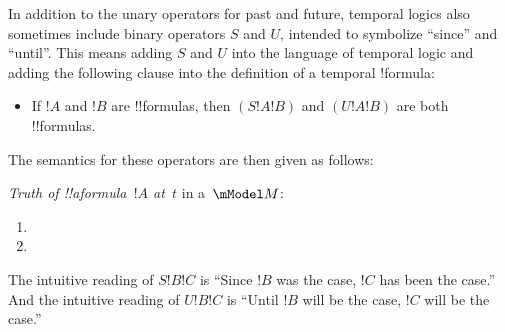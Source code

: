 \documentclass[../../../include/open-logic-section]{subfiles}
\begin{document}


In addition to the unary operators for past and future, temporal logics also sometimes
include binary operators $S$ and $U$, intended to symbolize ``since'' and ``until''. This means
adding $S$ and $U$ into the language of temporal logic and adding the following clause
into the definition of a temporal !{formula}:

\begin{itemize}

\item If $!A$ and $!B$ are !!{formula}s, then $(S !A !B)$ and $(U !A !B)$ are both !!{formula}s.

\end{itemize}

The semantics for these operators are then given as follows:
\begin{defn}
  \emph{Truth of !!a{formula}~$!A$ at~$t$} in a~$\mModel M$:
  \begin{enumerate}
  \item{}
   \item{}
  \end{enumerate} 
\end{defn}

The intuitive reading of $S !B !C$ is ``Since $!B$ was the case, $!C$ has been the case.'' And the
intuitive reading of $U !B !C$ is ``Until $!B$ will be the case, $!C$ will be the case.''
\end{document}
